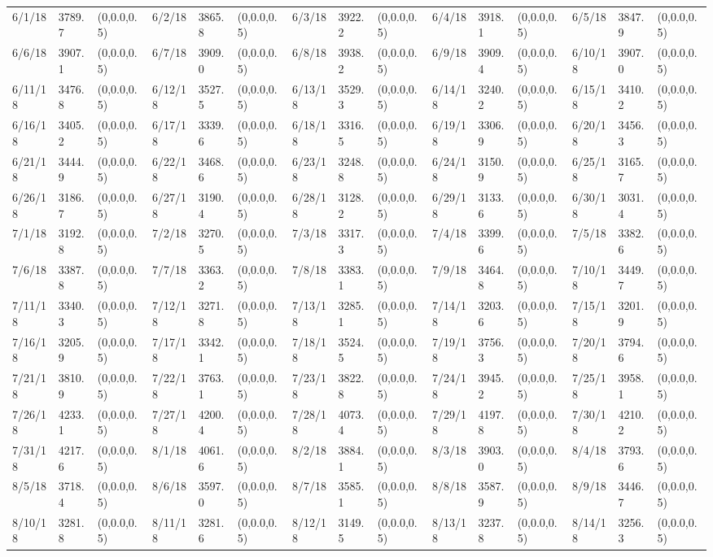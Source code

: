 \documentclass[12pt]{article}
\begin{document}
\begin{table}
\begin{center}
\begin{tabular}{p{15pt}p{15pt}p{25pt}p{15pt}p{15pt}p{25pt}p{15pt}p{15pt}p{25pt}p{15pt}p{15pt}p{25pt}p{15pt}p{15pt}p{25pt}}
        6/1/18&3789.7&(0,0.0,0.5)&6/2/18&3865.8&(0,0.0,0.5)&6/3/18&3922.2&(0,0.0,0.5)&6/4/18&3918.1&(0,0.0,0.5)&6/5/18&3847.9&(0,0.0,0.5)\\
        6/6/18&3907.1&(0,0.0,0.5)&6/7/18&3909.0&(0,0.0,0.5)&6/8/18&3938.2&(0,0.0,0.5)&6/9/18&3909.4&(0,0.0,0.5)&6/10/18&3907.0&(0,0.0,0.5)\\
        6/11/18&3476.8&(0,0.0,0.5)&6/12/18&3527.5&(0,0.0,0.5)&6/13/18&3529.3&(0,0.0,0.5)&6/14/18&3240.2&(0,0.0,0.5)&6/15/18&3410.2&(0,0.0,0.5)\\
        6/16/18&3405.2&(0,0.0,0.5)&6/17/18&3339.6&(0,0.0,0.5)&6/18/18&3316.5&(0,0.0,0.5)&6/19/18&3306.9&(0,0.0,0.5)&6/20/18&3456.3&(0,0.0,0.5)\\
        6/21/18&3444.9&(0,0.0,0.5)&6/22/18&3468.6&(0,0.0,0.5)&6/23/18&3248.8&(0,0.0,0.5)&6/24/18&3150.9&(0,0.0,0.5)&6/25/18&3165.7&(0,0.0,0.5)\\
        6/26/18&3186.7&(0,0.0,0.5)&6/27/18&3190.4&(0,0.0,0.5)&6/28/18&3128.2&(0,0.0,0.5)&6/29/18&3133.6&(0,0.0,0.5)&6/30/18&3031.4&(0,0.0,0.5)\\
        7/1/18&3192.8&(0,0.0,0.5)&7/2/18&3270.5&(0,0.0,0.5)&7/3/18&3317.3&(0,0.0,0.5)&7/4/18&3399.6&(0,0.0,0.5)&7/5/18&3382.6&(0,0.0,0.5)\\
        7/6/18&3387.8&(0,0.0,0.5)&7/7/18&3363.2&(0,0.0,0.5)&7/8/18&3383.1&(0,0.0,0.5)&7/9/18&3464.8&(0,0.0,0.5)&7/10/18&3449.7&(0,0.0,0.5)\\
        7/11/18&3340.3&(0,0.0,0.5)&7/12/18&3271.8&(0,0.0,0.5)&7/13/18&3285.1&(0,0.0,0.5)&7/14/18&3203.6&(0,0.0,0.5)&7/15/18&3201.9&(0,0.0,0.5)\\
        7/16/18&3205.9&(0,0.0,0.5)&7/17/18&3342.1&(0,0.0,0.5)&7/18/18&3524.5&(0,0.0,0.5)&7/19/18&3756.3&(0,0.0,0.5)&7/20/18&3794.6&(0,0.0,0.5)\\
        7/21/18&3810.9&(0,0.0,0.5)&7/22/18&3763.1&(0,0.0,0.5)&7/23/18&3822.8&(0,0.0,0.5)&7/24/18&3945.2&(0,0.0,0.5)&7/25/18&3958.1&(0,0.0,0.5)\\
        7/26/18&4233.1&(0,0.0,0.5)&7/27/18&4200.4&(0,0.0,0.5)&7/28/18&4073.4&(0,0.0,0.5)&7/29/18&4197.8&(0,0.0,0.5)&7/30/18&4210.2&(0,0.0,0.5)\\
        7/31/18&4217.6&(0,0.0,0.5)&8/1/18&4061.6&(0,0.0,0.5)&8/2/18&3884.1&(0,0.0,0.5)&8/3/18&3903.0&(0,0.0,0.5)&8/4/18&3793.6&(0,0.0,0.5)\\
        8/5/18&3718.4&(0,0.0,0.5)&8/6/18&3597.0&(0,0.0,0.5)&8/7/18&3585.1&(0,0.0,0.5)&8/8/18&3587.9&(0,0.0,0.5)&8/9/18&3446.7&(0,0.0,0.5)\\
        8/10/18&3281.8&(0,0.0,0.5)&8/11/18&3281.6&(0,0.0,0.5)&8/12/18&3149.5&(0,0.0,0.5)&8/13/18&3237.8&(0,0.0,0.5)&8/14/18&3256.3&(0,0.0,0.5)\\

\end{tabular}
\end{center}
\end{table}
\end{document}
